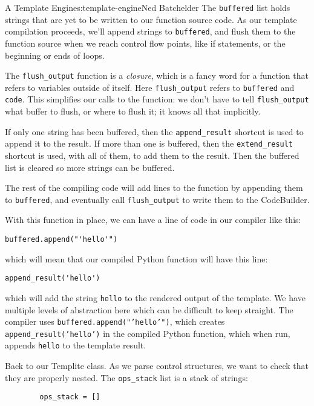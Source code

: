 \begin{aosachapter}{A Template Engine}{s:template-engine}{Ned Batchelder}
The \texttt{buffered} list holds strings that are yet to be written to
our function source code. As our template compilation proceeds, we'll
append strings to \texttt{buffered}, and flush them to the function
source when we reach control flow points, like if statements, or the
beginning or ends of loops.

The \texttt{flush\_output} function is a \emph{closure}, which is a
fancy word for a function that refers to variables outside of itself.
Here \texttt{flush\_output} refers to \texttt{buffered} and
\texttt{code}. This simplifies our calls to the function: we don't have
to tell \texttt{flush\_output} what buffer to flush, or where to flush
it; it knows all that implicitly.

If only one string has been buffered, then the \texttt{append\_result}
shortcut is used to append it to the result. If more than one is
buffered, then the \texttt{extend\_result} shortcut is used, with all of
them, to add them to the result. Then the buffered list is cleared so
more strings can be buffered.

The rest of the compiling code will add lines to the function by
appending them to \texttt{buffered}, and eventually call
\texttt{flush\_output} to write them to the CodeBuilder.

With this function in place, we can have a line of code in our compiler
like this:

\begin{verbatim}
buffered.append("'hello'")
\end{verbatim}

which will mean that our compiled Python function will have this line:

\begin{verbatim}
append_result('hello')
\end{verbatim}

which will add the string \texttt{hello} to the rendered output of the
template. We have multiple levels of abstraction here which can be
difficult to keep straight. The compiler uses
\texttt{buffered.append("'hello'")}, which creates
\texttt{append\_result('hello')} in the compiled Python function, which
when run, appends \texttt{hello} to the template result.

Back to our Templite class. As we parse control structures, we want to
check that they are properly nested. The \texttt{ops\_stack} list is a
stack of strings:

\begin{verbatim}
        ops_stack = []
\end{verbatim}


\end{aosachapter}
